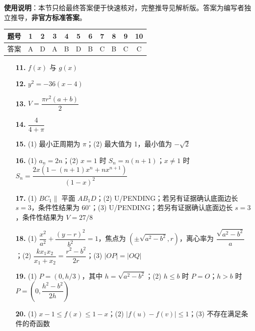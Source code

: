 
\begin{gknotice}
\textbf{使用说明}：本节只给最终答案便于快速核对，完整推导见解析版。答案为编写者独立推导，\textbf{非官方标准答案}。
\end{gknotice}

\begin{center}\begin{tabular}{ccccccccccc}
\toprule
题号 & 1 & 2 & 3 & 4 & 5 & 6 & 7 & 8 & 9 & 10 \\
\midrule
答案 & A & D & A & B & D & B & C & B & C & C \\
\bottomrule
\end{tabular}\end{center}

\begin{itemize}[leftmargin=2.6em]
  \item[\textbf{11.}] \(f(x)\) 与 \(g(x)\)
  \item[\textbf{12.}] \(y^2=-36(x-4)\)
  \item[\textbf{13.}] \(V=\dfrac{\pi r^2(a+b)}2\)
  \item[\textbf{14.}] \(\dfrac4{4+\pi}\)
\end{itemize}

\begin{itemize}[leftmargin=2.6em]
  \item[\textbf{15.}] (1) 最小正周期为 \(\pi\)；(2) 最大值为 1，最小值为 \(-\sqrt2\)
  \item[\textbf{16.}] (1) \(a_n=2n\)；(2) \(x=1\) 时 \(S_n=n(n+1)\)；\(x\ne1\) 时 \(S_n=\dfrac{2x(1-(n+1)x^n+nx^{n+1})}{(1-x)^2}\)
  \item[\textbf{17.}] (1) \(BC_1\parallel\) 平面 \(AB_1D\)；(2) U/PENDING；若另有证据确认底面边长 \(s=3\)，条件性结果为 \(60^\circ\)；(3) U/PENDING；若另有证据确认底面边长 \(s=3\)，条件性结果为 \(V=27/8\)
  \item[\textbf{18.}] (1) \(\dfrac{x^2}{a^2}+\dfrac{(y-r)^2}{b^2}=1\)，焦点为 \((\pm\sqrt{a^2-b^2},r)\)，离心率为 \(\dfrac{\sqrt{a^2-b^2}}a\)；(2) \(\dfrac{kx_1x_2}{x_1+x_2}=\dfrac{r^2-b^2}{2r}\)；(3) \(|OP|=|OQ|\)
  \item[\textbf{19.}] (1) \(P=(0,h/3)\)，其中 \(h=\sqrt{a^2-b^2}\)；(2) \(h\le b\) 时 \(P=O\)；\(h>b\) 时 \(P=(0,\dfrac{h^2-b^2}{2h})\)
  \item[\textbf{20.}] (1) \(x-1\le f(x)\le1-x\)；(2) \(|f(u)-f(v)|\le1\)；(3) 不存在满足条件的奇函数
\end{itemize}
